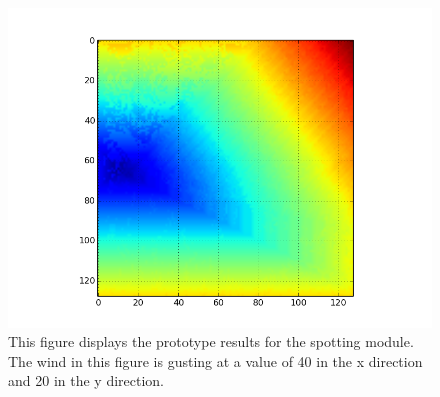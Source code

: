 \begin{figure}%
\centering
  \includegraphics[height=.38\textheight]{figures/results/spot_40_40.png}
  \caption{This figure displays the prototype results for the spotting module. The wind in this figure is gusting at a value of 40 in the x direction and 20 in the y direction.}
  \label{fig:spot_40_20}
\end{figure} 

